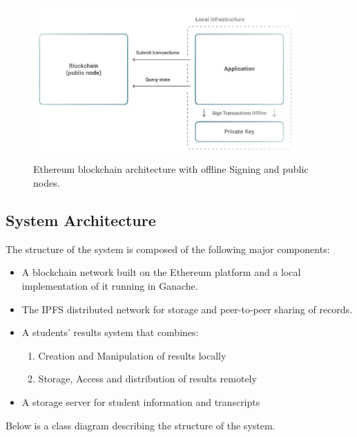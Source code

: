 \begin{itemize}
\begin{figure}[H]
  \caption{Ethereum blockchain architecture with offline Signing and public nodes.}
  \centering
  \includegraphics[width=0.9\textwidth]{images/OfflineBlockchainarch.png}
\end{figure}
\end{itemize}

\subsection{System Architecture}
The structure of the system is composed of the following major components:
\begin{itemize}
\item A blockchain network built on the Ethereum platform and a local implementation of it running in Ganache.
\item The IPFS distributed network for storage and peer-to-peer sharing of records.
\item A students' results system that combines:
\begin{enumerate}
\item Creation and Manipulation of results locally
\item Storage, Access and distribution of results remotely
\end{enumerate}
\item A storage server for student information and transcripts
\end{itemize}
Below is a class diagram describing the structure of the system.

